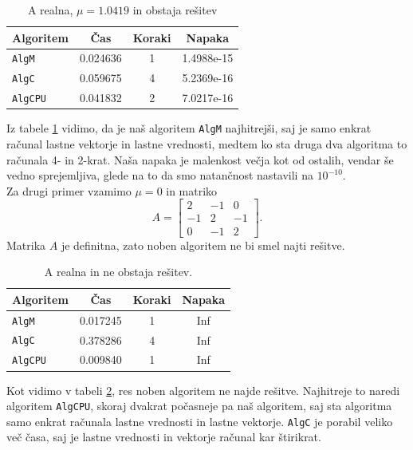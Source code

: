 \documentclass[12pt,a4paper]{amsart}
\theoremstyle{definition}
\theoremstyle{plain}
\begin{document}
\begin{table}[H]
\caption{A realna, $\mu = 1.0419$ in obstaja rešitev}
\begin{tabular}{|l|c|c|c|}
\hline
Algoritem & Čas & Koraki & Napaka\\
\hline
\hline
\verb+AlgM+ &0.024636&1&1.4988e-15\\
\hline
\verb+AlgC+ & 0.059675& 4&5.2369e-16 \\
\hline
\verb+AlgCPU+ &0.041832&2&7.0217e-16 \\
\hline
\end{tabular}
\label{t1}
\end{table}
Iz tabele \ref{t1} vidimo, da je naš algoritem \verb+AlgM+ najhitrejši, saj je samo enkrat računal lastne vektorje in lastne vrednosti, medtem ko sta druga dva algoritma to računala 4- in 2-krat. Naša napaka je malenkost večja kot od ostalih, vendar še vedno sprejemljiva, glede na to da smo natančnost nastavili na $10^{-10}$.\\
Za drugi primer vzamimo $\mu =0$ in matriko
\begin{equation*}
A=\begin{bmatrix}
2 &-1&0\\
-1&2&-1\\
0&-1&2
\end{bmatrix}.
\end{equation*}
Matrika $A$ je definitna, zato noben algoritem ne bi smel najti rešitve. 

\begin{table}[H]
\caption{A realna in ne obstaja rešitev.}
\begin{tabular}{|l|c|c|c|}
\hline
Algoritem & Čas & Koraki & Napaka\\
\hline
\hline
\verb+AlgM+ &0.017245&1&Inf \\
\hline
\verb+AlgC+ & 0.378286&4 & Inf \\
\hline
\verb+AlgCPU+ &0.009840 &1& Inf\\
\hline
\end{tabular}

\label{t2}
\end{table}

Kot vidimo v tabeli \ref{t2}, res noben algoritem ne najde rešitve. Najhitreje to naredi algoritem \verb-AlgCPU-, skoraj dvakrat počasneje pa naš algoritem, saj sta algoritma samo enkrat računala lastne vrednosti in lastne vektorje. \verb+AlgC+ je porabil veliko več časa, saj je lastne vrednosti in vektorje računal kar štirikrat.
\end{document}
